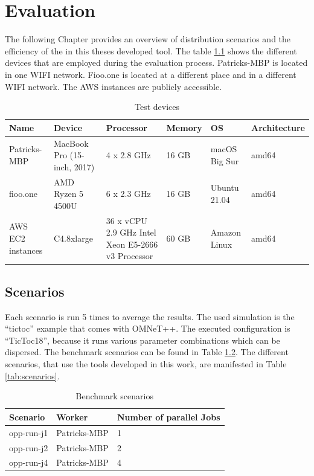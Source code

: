 \chapter{Evaluation}
The following Chapter provides an overview of distribution scenarios and the efficiency of the in this theses developed tool. The table \ref{tab:devices} shows the different devices that are employed during the evaluation process. Patricks-MBP is located in one WIFI network. Fioo.one is located at a different place and in a different WIFI network. The AWS instances are publicly accessible.


\begin{table}[h]
\begin{center}
    \begin{tabular}{ | m{5em} | m{5em}| m{6em} | m{5em} | m{5em}| m{6em} | }
      \hline
      Name & Device & Processor & Memory & OS & Architecture \\ 
      \hline
      Patricks-MBP & MacBook Pro (15-inch, 2017) & 4 x 2.8 GHz & 16 GB & macOS Big Sur & amd64 \\
      \hline
      fioo.one & AMD Ryzen 5 4500U & 6 x 2.3 GHz & 16 GB & Ubuntu 21.04 & amd64 \\
      \hline
      AWS EC2 instances & C4.8xlarge & 36 x vCPU 2.9 GHz Intel Xeon E5-2666 v3 Processor & 60 GB & Amazon Linux & amd64 \\
      \hline
    \end{tabular}
    \caption{\label{tab:devices} Test devices}
\end{center}
\end{table}

\section{Scenarios}

Each scenario is run 5 times to average the results. The used simulation is the “tictoc” example that comes with OMNeT++. The executed configuration is “TicToc18”, because it runs various parameter combinations which can be dispersed. The benchmark scenarios can be found in Table \ref{tab:benchmarks}. The different scenarios, that use the tools developed in this work, are manifested in Table \ref{tab:scenarios}.


\begin{table}[h]
\begin{center}
    \begin{tabular}{ | m{6em} | m{16em}| m{12em} | }
      \hline
      Scenario & Worker & Number of parallel Jobs \\ 
      \hline
      opp-run-j1 & Patricks-MBP & 1 \\
      \hline
      opp-run-j2 & Patricks-MBP & 2 \\
      \hline
      opp-run-j4 & Patricks-MBP & 4 \\
      \hline
    \end{tabular}
    \caption{\label{tab:benchmarks} Benchmark scenarios}
\end{center}
\end{table}


